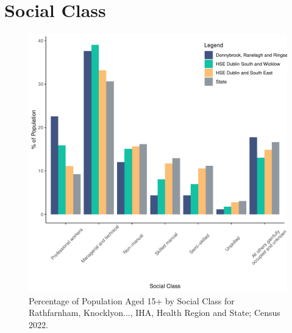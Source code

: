 \documentclass{article}
\begin{document}
\section{Social Class}\label{sect:SC}
\begin{figure}[H]
	\centering
	\includegraphics[width = 140mm]{../figures/SocialClassED.pdf}
	\caption{Percentage of Population Aged 15+ by Social Class for Rathfarnham, Knocklyon..., IHA, Health Region and State; Census 2022.}
	\label{fig:vbnv}
	\end{figure}
\end{document}
